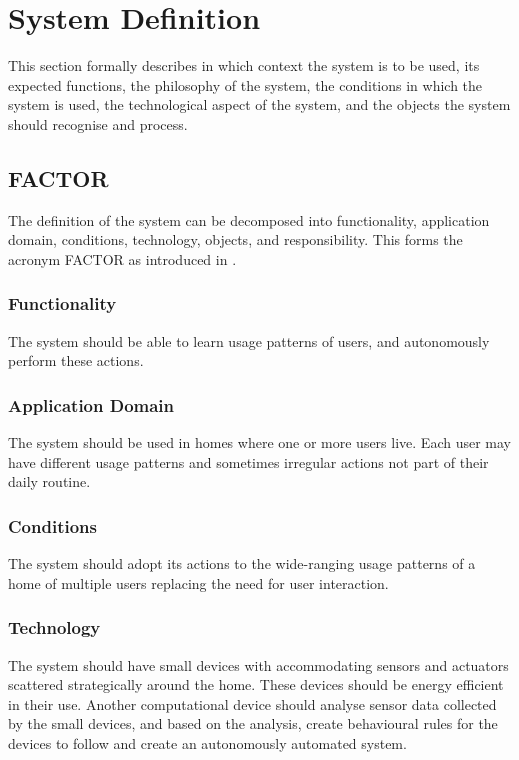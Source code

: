 \section{System Definition}

This section formally describes in which context the system is to be used, its
expected functions, the philosophy of the system, the conditions in which the
system is used, the technological aspect of the system, and the objects the
system should recognise and process.

\subsection{FACTOR}

The definition of the system can be decomposed into functionality, application
domain, conditions, technology, objects, and responsibility. This forms the
acronym FACTOR as introduced in \cite{mathiassen2001objektorienteret}.

\subsubsection{Functionality}

The system should be able to learn usage patterns of users, and autonomously
perform these actions.

\subsubsection{Application Domain}

The system should be used in homes where one or more users live. Each user may
have different usage patterns and sometimes irregular actions not part of their
daily routine.

\subsubsection{Conditions}

The system should adopt its actions to the wide-ranging usage patterns of a home
of multiple users replacing the need for user interaction.

\subsubsection{Technology}

The system should have small devices with accommodating sensors and actuators scattered strategically around the home.
These devices should be energy efficient in their use. Another computational
device should analyse sensor data collected by the small devices, and based on
the analysis, create behavioural rules for the devices to follow and create an autonomously automated system.

